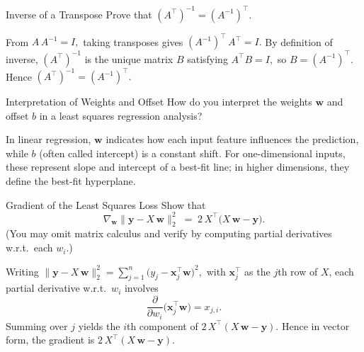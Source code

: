 \documentclass{article}
\begin{document}
\begin{exercise}{Inverse of a Transpose}
  Prove that $(A^\top)^{-1} = (A^{-1})^\top$.
  
  \begin{solution}
    From $A\,A^{-1} = I,$ taking transposes gives $(A^{-1})^\top \,A^\top = I.$ 
    By definition of inverse, $(A^\top)^{-1}$ is the unique matrix $B$ satisfying $A^\top B = I,$ 
    so $B = (A^{-1})^\top.$ 
    Hence $(A^\top)^{-1} = (A^{-1})^\top.$
  \end{solution}
\end{exercise}


\begin{exercise}{Interpretation of Weights and Offset}
  How do you interpret the weights $\mathbf{w}$ and offset $b$ in a least squares regression analysis?
  
  \begin{solution}
    In linear regression, $\mathbf{w}$ indicates how each input feature influences the prediction, 
    while $b$ (often called intercept) is a constant shift. 
    For one-dimensional inputs, these represent slope and intercept of a best-fit line; 
    in higher dimensions, they define the best-fit hyperplane.
  \end{solution}
\end{exercise}

\begin{exercise}{Gradient of the Least Squares Loss}
  Show that 
  \[
    \nabla_{\mathbf{w}} \bigl\|\mathbf{y} - X\,\mathbf{w}\bigr\|_2^2 
    \;=\; 
    2\,X^\top\!\bigl(X\,\mathbf{w} - \mathbf{y}\bigr).
  \]
  (You may omit matrix calculus and verify by computing partial derivatives w.r.t.\ each $w_i$.)
  
  \begin{solution}
    Writing $\|\mathbf{y} - X\,\mathbf{w}\|_2^2 = \sum_{j=1}^n \bigl(y_j - \mathbf{x}_j^\top \mathbf{w}\bigr)^2,$ 
    with $\mathbf{x}_j^\top$ as the $j$th row of $X$, each partial derivative w.r.t.\ $w_i$ involves
    \[
      \frac{\partial}{\partial w_i}\bigl(\mathbf{x}_j^\top \mathbf{w}\bigr) = x_{j,i}.
    \]
    Summing over $j$ yields the $i$th component of $2\,X^\top\!(X\,\mathbf{w} - \mathbf{y})$. 
    Hence in vector form, the gradient is $2\,X^\top\!(X\,\mathbf{w} - \mathbf{y})$.
  \end{solution}
\end{exercise}
\end{document}
